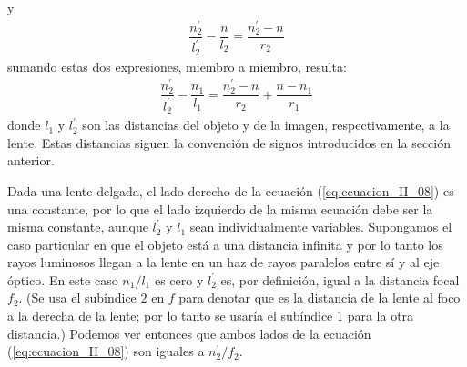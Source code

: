 \documentclass[14pt]{extarticle}
\begin{document}
y
\begin{align}
\dfrac{n_{2}^{\prime}}{l_{2}^{\prime}} - \dfrac{n}{l_{2}} = \dfrac{n_{2}^{\prime} - n}{r_{2}}
\label{eq:ecuacion_II_07}
\end{align}
sumando estas dos expresiones, miembro a miembro, resulta:
\begin{align}
\dfrac{n_{2}^{\prime}}{l_{2}^{\prime}} - \dfrac{n_{1}}{l_{1}} = \dfrac{n_{2}^{\prime} - n}{r_{2}} + \dfrac{n - n_{1}}{r_{1}}
\label{eq:ecuacion_II_08}
\end{align}
donde $l_{1}$ y $l_{2}^{\prime}$ son las distancias del objeto y de la imagen, respectivamente, a la lente. Estas distancias siguen la convención de signos introducidos en la sección anterior. 

Dada una lente delgada, el lado derecho de la ecuación (\ref{eq:ecuacion_II_08}) es una constante, por lo que el lado izquierdo de la misma ecuación debe ser la misma constante, aunque $l_{2}^{\prime}$ y $l_{1}$ sean individualmente variables. Supongamos el caso particular en que el objeto está a una distancia infinita y por lo tanto los rayos luminosos llegan a la lente en un haz de rayos paralelos entre sí y al eje óptico. En este caso $n_{1}/l_{1}$ es cero y $l_{2}^{\prime}$ es, por definición, igual a la distancia focal $f_{2}$. (Se usa el subíndice $2$ en $f$ para denotar que es la distancia de la lente al foco a la derecha de la lente; por lo tanto se usaría el subíndice $1$ para la otra distancia.) Podemos ver entonces que ambos lados de la ecuación (\ref{eq:ecuacion_II_08}) son iguales a $n_{2}^{\prime}/f_{2}$.
\end{document}
